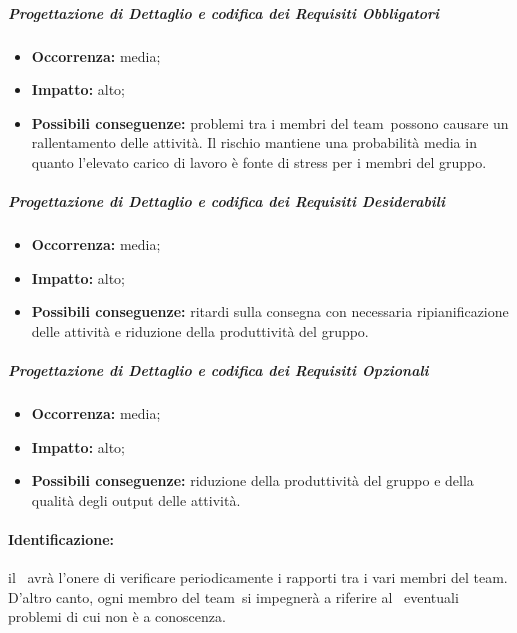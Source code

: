 \documentclass[../PianoProgetto.tex]{subfiles}
\begin{document}
		\subparagraph*{Progettazione di Dettaglio e codifica dei Requisiti Obbligatori}
			\begin{itemize}[label={-}]
				\item \textbf{Occorrenza:} media;
				\item \textbf{Impatto:} alto;
				\item \textbf{Possibili conseguenze:} problemi tra i membri del team\g\ possono causare un rallentamento delle attività. Il rischio mantiene una probabilità media in quanto l'elevato carico di lavoro è fonte di stress per i membri del gruppo. 
			\end{itemize}
			
		\subparagraph*{Progettazione di Dettaglio e codifica dei Requisiti Desiderabili}
			\begin{itemize}[label={-}]
				\item \textbf{Occorrenza:} media;
				\item \textbf{Impatto:} alto;
				\item \textbf{Possibili conseguenze:} ritardi sulla consegna con necessaria ripianificazione delle attività e riduzione della produttività del gruppo.
			\end{itemize}
			
		\subparagraph*{Progettazione di Dettaglio e codifica dei Requisiti Opzionali}
			\begin{itemize}[label={-}]
				\item \textbf{Occorrenza:} media;
				\item \textbf{Impatto:} alto;
				\item \textbf{Possibili conseguenze:} riduzione della produttività del gruppo e della qualità degli output delle attività.
			\end{itemize}
			
	
	\paragraph*{Identificazione:} il \responsabilediprogetto\ avrà l'onere di verificare periodicamente i rapporti tra i vari membri del team\g. D'altro canto, ogni membro del team\g\ si impegnerà a riferire al \responsabilediprogetto\ eventuali problemi di cui non è a conoscenza.
	
\end{document}
